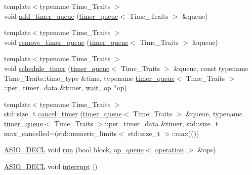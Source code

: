 \begin{DoxyCompactItemize}
\item 
{\footnotesize template$<$typename Time\+\_\+\+Traits $>$ }\\void \hyperlink{classasio_1_1detail_1_1select__reactor_a9d0111485a88f61ff5b2d0359da1648d}{add\+\_\+timer\+\_\+queue} (\hyperlink{classasio_1_1detail_1_1timer__queue}{timer\+\_\+queue}$<$ Time\+\_\+\+Traits $>$ \&queue)
\item 
{\footnotesize template$<$typename Time\+\_\+\+Traits $>$ }\\void \hyperlink{classasio_1_1detail_1_1select__reactor_acc5e4fd590579b35a2013e7443ec9aab}{remove\+\_\+timer\+\_\+queue} (\hyperlink{classasio_1_1detail_1_1timer__queue}{timer\+\_\+queue}$<$ Time\+\_\+\+Traits $>$ \&queue)
\item 
{\footnotesize template$<$typename Time\+\_\+\+Traits $>$ }\\void \hyperlink{classasio_1_1detail_1_1select__reactor_a74079c17bdd5b0546d723aa21e97bad9}{schedule\+\_\+timer} (\hyperlink{classasio_1_1detail_1_1timer__queue}{timer\+\_\+queue}$<$ Time\+\_\+\+Traits $>$ \&queue, const typename Time\+\_\+\+Traits\+::time\+\_\+type \&time, typename \hyperlink{classasio_1_1detail_1_1timer__queue}{timer\+\_\+queue}$<$ Time\+\_\+\+Traits $>$\+::per\+\_\+timer\+\_\+data \&timer, \hyperlink{classasio_1_1detail_1_1wait__op}{wait\+\_\+op} $\ast$op)
\item 
{\footnotesize template$<$typename Time\+\_\+\+Traits $>$ }\\std\+::size\+\_\+t \hyperlink{classasio_1_1detail_1_1select__reactor_ac5b68a2b1abf0a5fc92174be124b5c5b}{cancel\+\_\+timer} (\hyperlink{classasio_1_1detail_1_1timer__queue}{timer\+\_\+queue}$<$ Time\+\_\+\+Traits $>$ \&queue, typename \hyperlink{classasio_1_1detail_1_1timer__queue}{timer\+\_\+queue}$<$ Time\+\_\+\+Traits $>$\+::per\+\_\+timer\+\_\+data \&timer, std\+::size\+\_\+t max\+\_\+cancelled=(std\+::numeric\+\_\+limits$<$ std\+::size\+\_\+t $>$\+::max)())
\item 
\hyperlink{config_8hpp_ab54d01ea04afeb9a8b39cfac467656b7}{A\+S\+I\+O\+\_\+\+D\+E\+C\+L} void \hyperlink{classasio_1_1detail_1_1select__reactor_a16589c3baed79b28977fe1001e3be565}{run} (bool block, \hyperlink{classasio_1_1detail_1_1op__queue}{op\+\_\+queue}$<$ \hyperlink{namespaceasio_1_1detail_a338968609bec20e37145309f8f9ec936}{operation} $>$ \&ops)
\item 
\hyperlink{config_8hpp_ab54d01ea04afeb9a8b39cfac467656b7}{A\+S\+I\+O\+\_\+\+D\+E\+C\+L} void \hyperlink{classasio_1_1detail_1_1select__reactor_a58cb1aa36264f0cb376a622d44b1ef20}{interrupt} ()
\end{DoxyCompactItemize}

